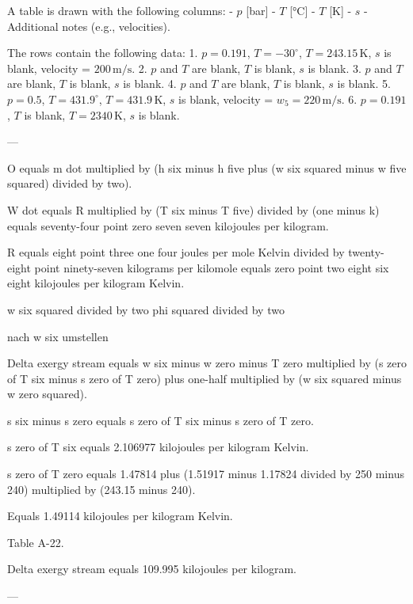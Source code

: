 A table is drawn with the following columns:  
- \( p \) [bar]  
- \( T \) [°C]  
- \( T \) [K]  
- \( s \)  
- Additional notes (e.g., velocities).  

The rows contain the following data:  
1. \( p = 0.191 \), \( T = -30^\circ \), \( T = 243.15 \, \text{K} \), \( s \) is blank, velocity = \( 200 \, \text{m/s} \).  
2. \( p \) and \( T \) are blank, \( T \) is blank, \( s \) is blank.  
3. \( p \) and \( T \) are blank, \( T \) is blank, \( s \) is blank.  
4. \( p \) and \( T \) are blank, \( T \) is blank, \( s \) is blank.  
5. \( p = 0.5 \), \( T = 431.9^\circ \), \( T = 431.9 \, \text{K} \), \( s \) is blank, velocity = \( w_5 = 220 \, \text{m/s} \).  
6. \( p = 0.191 \), \( T \) is blank, \( T = 2340 \, \text{K} \), \( s \) is blank.  

---

O equals m dot multiplied by (h six minus h five plus (w six squared minus w five squared) divided by two).  

W dot equals R multiplied by (T six minus T five) divided by (one minus k) equals seventy-four point zero seven seven kilojoules per kilogram.  

R equals eight point three one four joules per mole Kelvin divided by twenty-eight point ninety-seven kilograms per kilomole equals zero point two eight six eight kilojoules per kilogram Kelvin.  

w six squared divided by two  
phi squared divided by two  

nach w six umstellen

Delta exergy stream equals w six minus w zero minus T zero multiplied by (s zero of T six minus s zero of T zero) plus one-half multiplied by (w six squared minus w zero squared).  

s six minus s zero equals s zero of T six minus s zero of T zero.  

s zero of T six equals 2.106977 kilojoules per kilogram Kelvin.  

s zero of T zero equals 1.47814 plus (1.51917 minus 1.17824 divided by 250 minus 240) multiplied by (243.15 minus 240).  

Equals 1.49114 kilojoules per kilogram Kelvin.  

Table A-22.  

Delta exergy stream equals 109.995 kilojoules per kilogram.  

---